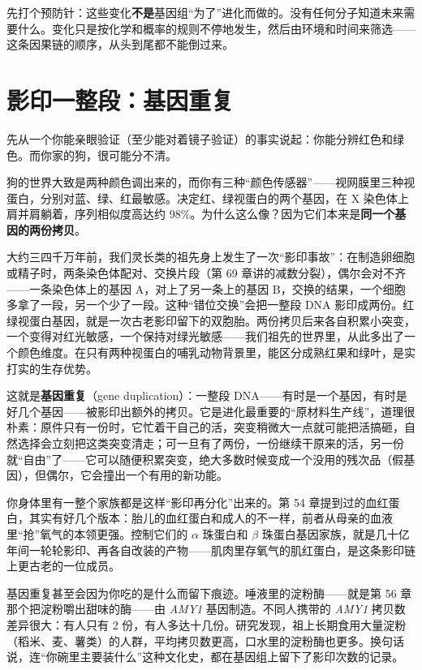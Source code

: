 先打个预防针：这些变化\textbf{不是}基因组“为了”进化而做的。没有任何分子知道未来需要什么。变化只是按化学和概率的规则不停地发生，然后由环境和时间来筛选——这条因果链的顺序，从头到尾都不能倒过来。

\section{影印一整段：基因重复}

先从一个你能亲眼验证（至少能对着镜子验证）的事实说起：你能分辨红色和绿色。而你家的狗，很可能分不清。

狗的世界大致是两种颜色调出来的，而你有三种“颜色传感器”——视网膜里三种视蛋白，分别对蓝、绿、红最敏感。决定红、绿视蛋白的两个基因，在 X 染色体上肩并肩躺着，序列相似度高达约 98\%。为什么这么像？因为它们本来是\textbf{同一个基因的两份拷贝}。

大约三四千万年前，我们灵长类的祖先身上发生了一次“影印事故”：在制造卵细胞或精子时，两条染色体配对、交换片段（第 69 章讲的减数分裂），偶尔会对不齐——一条染色体上的基因 A，对上了另一条上的基因 B，交换的结果，一个细胞多拿了一段，另一个少了一段。这种“错位交换”会把一整段 DNA 影印成两份。红绿视蛋白基因，就是一次古老影印留下的双胞胎。两份拷贝后来各自积累小突变，一个变得对红光敏感，一个保持对绿光敏感——我们祖先的世界里，从此多出了一个颜色维度。在只有两种视蛋白的哺乳动物背景里，能区分成熟红果和绿叶，是实打实的生存优势。

这就是\textbf{基因重复}（gene duplication）：一整段 DNA——有时是一个基因，有时是好几个基因——被影印出额外的拷贝。它是进化最重要的“原材料生产线”，道理很朴素：原件只有一份时，它忙着干自己的活，突变稍微大一点就可能把活搞砸，自然选择会立刻把这类突变清走；可一旦有了两份，一份继续干原来的活，另一份就“自由”了——它可以随便积累突变，绝大多数时候变成一个没用的残次品（假基因），但偶尔，它会撞出一个有用的新功能。

你身体里有一整个家族都是这样“影印再分化”出来的。第 54 章提到过的血红蛋白，其实有好几个版本：胎儿的血红蛋白和成人的不一样，前者从母亲的血液里“抢”氧气的本领更强。控制它们的 $\alpha$ 珠蛋白和 $\beta$ 珠蛋白基因家族，就是几十亿年间一轮轮影印、再各自改装的产物——肌肉里存氧气的肌红蛋白，是这条影印链上更古老的一位成员。

基因重复甚至会因为你吃的是什么而留下痕迹。唾液里的淀粉酶——就是第 56 章那个把淀粉嚼出甜味的酶——由 \emph{AMY1} 基因制造。不同人携带的 \emph{AMY1} 拷贝数差异很大：有人只有 2 份，有人多达十几份。研究发现，祖上长期食用大量淀粉（稻米、麦、薯类）的人群，平均拷贝数更高，口水里的淀粉酶也更多。换句话说，连“你碗里主要装什么”这种文化史，都在基因组上留下了影印次数的记录。

